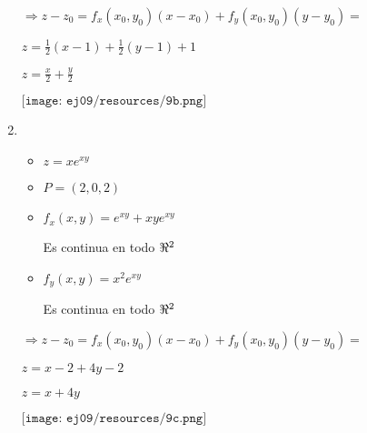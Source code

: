 \documentclass[../practica_04.tex]{subfiles}
\begin{document}
\begin{enumerate}
            $ \Rightarrow z - z_0 = f_x(x_0,y_0)(x - x_0) + f_y(x_0,y_0)(y-y_0) =$

            $ z = \frac{1}{2}(x-1) + \frac{1}{2}(y-1) + 1 $

            $ z = \frac{x}{2} + \frac{y}{2} $

            $ \texttt{[image: ej09/resources/9b.png]}  $

        \item 
            \begin{itemize}
                \item $z = xe^{xy}$
                \item $P = (2,0,2)$
            \end{itemize}

            \begin{itemize}
                \item $f_x(x,y) = e^{xy} + xye^{xy}$
            
                    Es continua en todo ${\real}^2$
                \item $f_y(x,y) = x^2e^{xy}$

                    Es continua en todo ${\real}^2$
            \end{itemize}

            $ \Rightarrow z - z_0 = f_x(x_0,y_0)(x - x_0) + f_y(x_0,y_0)(y-y_0) =$

            $ z = x - 2 + 4y - 2 $

            $ z = x + 4y $

            $ \texttt{[image: ej09/resources/9c.png]}  $

    \end{enumerate}
\end{document}
